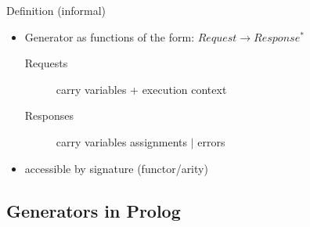 \documentclass[presentation]{beamer}
\begin{document}
\begin{frame}[allowframebreaks]
    \begin{block}{Definition (informal)}
        \begin{itemize}
            \item Generator as \alert{functions} of the form: $Request \rightarrow Response^*$
            \begin{description}
                \item[Requests] carry variables + execution context
                \item[Responses] carry variables assignments $\mid$ errors
            \end{description}
            \item accessible by \alert{signature} (functor/arity)
        \end{itemize}
    \end{block}

\end{frame}

\subsection{Generators in Prolog}
\end{document}
